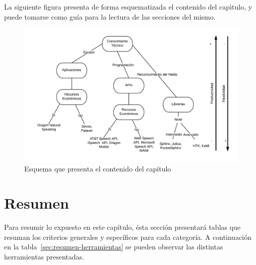 La siguiente figura presenta de forma esquematizada el contenido del cap{\'\i}tulo, y puede tomarse como
gu\'ia para la lectura de las secciones del mismo.

\begin{figure}[H]
\centering
\includegraphics[width=0.9\linewidth]{./graphics/esquema-herramientas.png}
\caption{Esquema que presenta el contenido del cap\'itulo}
\label{figure:esquema-herramientas}
\end{figure}





\section{Resumen}

Para resumir lo expuesto en este cap\'itulo, \'esta secci\'on presentar\'a tablas que resuman los criterios generales y espec\'ificos
para cada categor\'ia. A continuaci\'on en la tabla~\ref{sec:resumen-herramientas} se pueden observar las distintas
herramientas presentadas.

